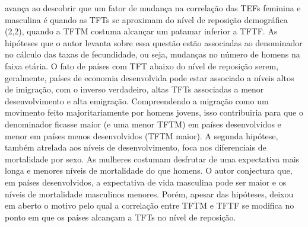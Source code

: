 { avança ao descobrir que um fator de mudança na correlação das TEFs feminina e masculina é quando as TFTs se aproximam do nível de reposição demográfica (2,2), quando a TFTM costuma alcançar um patamar inferior a TFTF. As hipóteses que o autor levanta sobre essa questão estão associadas ao denominador no cálculo das taxas de fecundidade, ou seja, mudanças no número de homens na faixa etária. O fato de países com TFT abaixo do nível de reposição serem, geralmente, países de economia desenvolvida pode estar associado a níveis altos de imigração, com o inverso verdadeiro, altas TFTs associadas a menor desenvolvimento e alta emigração. Compreendendo a migração como um movimento feito majoritariamente por homens jovens, isso contribuiria para que o denominador ficasse maior (e uma menor TFTM) em países desenvolvidos e menor em países menos desenvolvidos (TFTM maior). A segunda hipótese, também atrelada aos níveis de desenvolvimento, foca nos diferenciais de mortalidade por sexo. As mulheres costumam desfrutar de uma expectativa mais longa e menores níveis de mortalidade do que homens. O autor conjectura que, em países desenvolvidos, a expectativa de vida masculina pode ser maior e os níveis de mortalidade masculinos menores. Porém, apesar das hipóteses, deixou em aberto o motivo pelo qual a correlação entre TFTM e TFTF se modifica no ponto em que os países alcançam a TFTs no nível de reposição.

\begin{comment}
- diferenças de idade na parturição ---
\cite{dudel2021male}:
----Embora observemos padrões bastante diversos nas diferenças de idade entre países e grupos de países, o mecanismo demográfico subjacente é, em todos os casos, diferenças de gênero no adiamento. Especificamente, em todos os países que estudamos, a idade média ao dar à luz tem aumentado continuamente desde 1990, tanto para homens como para mulheres (ver materiais suplementares para obter detalhes); ou seja, tanto homens como mulheres têm adiado o parto. Em combinação com uma idade média de parto mais elevada para os homens, esta conclusão sugere que as mudanças na diferença de idade parental no momento do parto se devem a diferenças na velocidade com que o adiamento avança: se progredir mais rapidamente entre os homens do que entre as mulheres, a diferença de idade aumenta; mas se, por outro lado, avança mais rapidamente entre as mulheres do que entre os homens, a diferença de idade diminui----

tefs - United Nations Demographic Yearbook 2021





\end{comment}}
